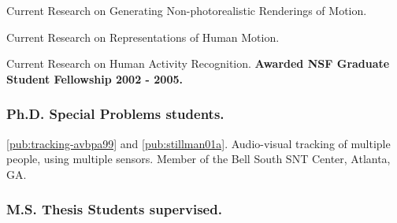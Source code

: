 \begin{description}
 {Current
Research on Generating Non-photorealistic Renderings of Motion.}

 {Current
Research on Representations of Human Motion.}

 {Current
Research on Human Activity Recognition.
\newline \textbf{Awarded NSF Graduate Student Fellowship 2002 - 2005.}}





\end{description}

\subsubsection*{Ph.D. Special Problems students.}


\begin{description}




{\ref{pub:tracking-avbpa99} and \ref{pub:stillman01a}.} {Audio-visual tracking of multiple people, using
multiple sensors.
\newline  Member of the Bell South SNT Center, Atlanta, GA.}


\end{description}


%

\subsubsection*{M.S. Thesis Students supervised.}

